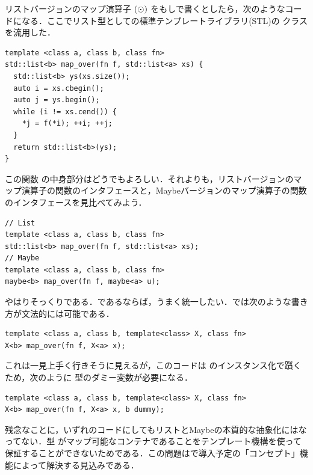 \documentclass[a5paper,twoside,fleqn,draft]{jsbook}
\begin{document}
リストバージョンのマップ演算子 $(\operatorname{\odot})$ をもし\cxx で書くとしたら，次のようなコードになる．ここでリスト型として\cxx の標準テンプレートライブラリ(STL)の  クラスを流用した．
\begin{cxxcode}
\begin{verbatim}
template <class a, class b, class fn>
std::list<b> map_over(fn f, std::list<a> xs) {
  std::list<b> ys(xs.size());
  auto i = xs.cbegin();
  auto j = ys.begin();
  while (i != xs.cend()) {
    *j = f(*i); ++i; ++j;
  }
  return std::list<b>(ys);
}
\end{verbatim}
\end{cxxcode}
この関数  の中身部分はどうでもよろしい．それよりも，リストバージョンのマップ演算子の\cxx 関数のインタフェースと，Maybeバージョンのマップ演算子の\cxx 関数のインタフェースを見比べてみよう．
\begin{cxxcode}
\begin{verbatim}
// List
template <class a, class b, class fn>
std::list<b> map_over(fn f, std::list<a> xs);
// Maybe
template <class a, class b, class fn>
maybe<b> map_over(fn f, maybe<a> u);
\end{verbatim}
\end{cxxcode}
やはりそっくりである．であるならば，うまく統一したい．\cxx では次のような書き方が文法的には可能である．
\begin{cxxcode}
\begin{verbatim}
template <class a, class b, template<class> X, class fn>
X<b> map_over(fn f, X<a> x);
\end{verbatim}
\end{cxxcode}
これは一見上手く行きそうに見えるが，このコードは  のインスタンス化で躓くため，次のように  型のダミー変数が必要になる．
\begin{cxxcode}
\begin{verbatim}
template <class a, class b, template<class> X, class fn>
X<b> map_over(fn f, X<a> x, b dummy);
\end{verbatim}
\end{cxxcode}
残念なことに，いずれのコードにしてもリストとMaybeの本質的な抽象化にはなってない．型  がマップ可能なコンテナであることをテンプレート機構を使って保証することができないためである．この問題は\cxxtwelve で導入予定の「コンセプト」機能によって解決する見込みである．

\end{document}
